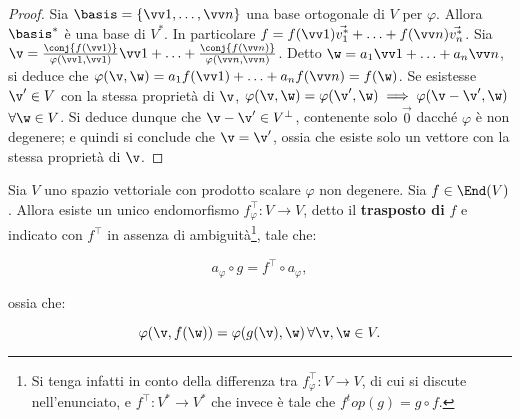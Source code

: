 \begin{proof}
	Sia $\basis = \{ \vv 1, \ldots, \vv n \}$ una base ortogonale di $V$ per $\varphi$. Allora $\basis^*$ è una base di $V^*$. In
	particolare $f = f(\vv 1) \vec{v_1^*} + \ldots + f(\vv n) \vec{v_n^*}$. Sia $\v = \frac{\conj{f(\vv 1)}}{\varphi(\vv 1, \vv 1)} \vv 1 + \ldots + \frac{\conj{f(\vv n)}}{\varphi(\vv n, \vv n)}$. Detto $\w = a_1 \vv 1 + \ldots + a_n \vv n$,
	si deduce che $\varphi(\v, \w) = a_1 f(\vv 1) + \ldots + a_n f(\vv n) = f(\w)$. Se esistesse $\v' \in V$ con
	la stessa proprietà di $\v$, $\varphi(\v, \w) = \varphi(\v', \w) \implies \varphi(\v - \v', \w)$ $\forall \w \in V$. Si deduce dunque che $\v - \v' \in V^\perp$, contenente solo $\vec 0$ dacché $\varphi$ è non degenere;
	e quindi si conclude che $\v = \v'$, ossia che esiste solo un vettore con la stessa proprietà di $\v$.
\end{proof}

\begin{proposition}
	Sia $V$ uno spazio vettoriale con prodotto scalare $\varphi$ non degenere.
	Sia $f \in \End(V)$. Allora esiste un unico endomorfismo
	$f_\varphi^\top : V \to V$, detto il \textbf{trasposto di} $f$ e indicato con $f^\top$ in assenza
	di ambiguità\footnote{Si tenga infatti in conto della differenza tra $f_\varphi^\top : V \to V$, di cui si discute
		nell'enunciato, e $f^\top : V^* \to V^*$ che invece è tale che $f^top(g) = g \circ f$.}, tale che:
	
	\[ a_\varphi \circ g = f^\top \circ a_\varphi, \]
	
	\vskip 0.05in
	
	ossia che:
	
	\[ \varphi(\v, f(\w)) = \varphi(g(\v), \w) \, \forall \v, \w \in V. \]
\end{proposition}

